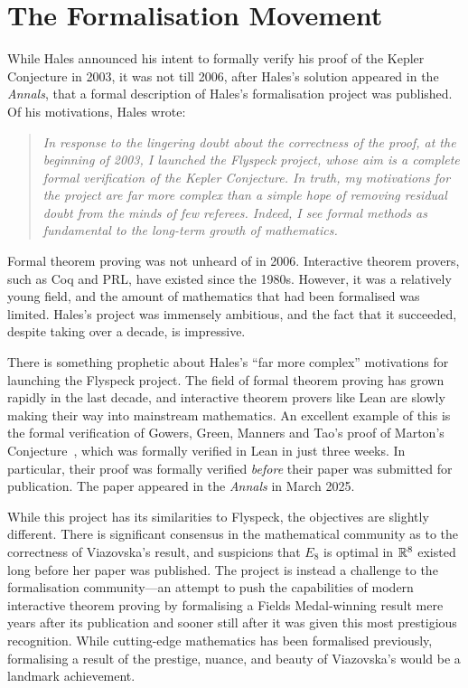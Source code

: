 \section{The Formalisation Movement}

While Hales announced his intent to formally verify his proof of the Kepler Conjecture in 2003, it was not till 2006, after Hales's solution appeared in the \textit{Annals}, that a formal description of Hales's formalisation project was published. Of his motivations, Hales wrote:
\begin{quote}
    \textit{In response to the lingering doubt about the correctness of the proof, at the beginning of 2003, I launched the \emph{Flyspeck} project, whose aim is a complete formal verification of the Kepler Conjecture. In truth, my motivations for the project are far more complex than a simple hope of removing residual doubt from the minds of few referees. Indeed, I see formal methods as fundamental to the long-term growth of mathematics.}~\cite{FlyspeckAnnouncement}
\end{quote}
Formal theorem proving was not unheard of in 2006. Interactive theorem provers, such as Coq and PRL, have existed since the 1980s. However, it was a relatively young field, and the amount of mathematics that had been formalised was limited. Hales's project was immensely ambitious, and the fact that it succeeded, despite taking over a decade, is impressive.

There is something prophetic about Hales's ``far more complex'' motivations for launching the Flyspeck project. The field of formal theorem proving has grown rapidly in the last decade, and interactive theorem provers like Lean are slowly making their way into mainstream mathematics. An excellent example of this is the formal verification of Gowers, Green, Manners and Tao's proof of Marton's Conjecture~\cite{PFRPublished}, which was formally verified in Lean in just three weeks. In particular, their proof was formally verified \textit{before} their paper was submitted for publication. The paper appeared in the \textit{Annals} in March 2025.

While this project has its similarities to Flyspeck, the objectives are slightly different. There is significant consensus in the mathematical community as to the correctness of Viazovska's result, and suspicions that $E_8$ is optimal in $\mathbb{R}^8$ existed long before her paper was published. The project is instead a challenge to the formalisation community---an attempt to push the capabilities of modern interactive theorem proving by formalising a Fields Medal-winning result mere years after its publication and sooner still after it was given this most prestigious recognition. While cutting-edge mathematics has been formalised \cite{liquidtensor} previously, formalising a result of the prestige, nuance, and beauty of Viazovska's would be a landmark achievement.